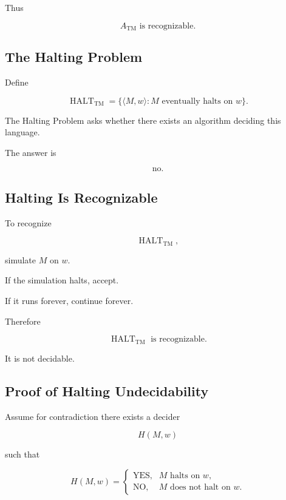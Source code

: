 Thus

\[
\boxed{
A_{\mathrm{TM}}
\text{ is recognizable}.
}
\]

\subsection{The Halting Problem}
\label{subsec:halting-problem}

Define

\[
\boxed{
\operatorname{HALT}_{\mathrm{TM}}
=
\{
\langle M,w\rangle:
M
\text{ eventually halts on }w
\}.
}
\]

The Halting Problem asks whether there exists an algorithm deciding this
language.

The answer is

\[
\boxed{
\text{no}.
}
\]

\subsection{Halting Is Recognizable}
\label{subsec:halting-recognizable}

To recognize

\[
\operatorname{HALT}_{\mathrm{TM}},
\]

simulate \(M\) on \(w\).

If the simulation halts, accept.

If it runs forever, continue forever.

Therefore

\[
\boxed{
\operatorname{HALT}_{\mathrm{TM}}
\text{ is recognizable}.
}
\]

It is not decidable.

\subsection{Proof of Halting Undecidability}
\label{subsec:halting-undecidability-proof}

Assume for contradiction there exists a decider

\[
H(M,w)
\]

such that

\[
H(M,w)
=
\begin{cases}
\text{YES},&M\text{ halts on }w,\\
\text{NO},&M\text{ does not halt on }w.
\end{cases}
\]


